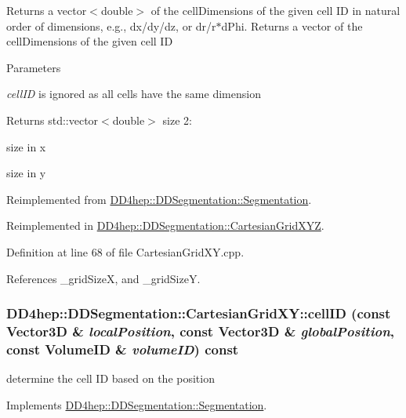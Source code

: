 Returns a vector$<$double$>$ of the cellDimensions of the given cell ID in natural order of dimensions, e.g., dx/dy/dz, or dr/r$\ast$dPhi. Returns a vector of the cellDimensions of the given cell ID 
\begin{DoxyParams}{Parameters}
\item[{\em cellID}]is ignored as all cells have the same dimension \end{DoxyParams}
\begin{DoxyReturn}{Returns}
std::vector$<$double$>$ size 2:
\begin{DoxyEnumerate}
\item size in x
\item size in y 
\end{DoxyEnumerate}
\end{DoxyReturn}


Reimplemented from \hyperlink{class_d_d4hep_1_1_d_d_segmentation_1_1_segmentation_a9710f4942d7f6b52ae5342652e17c88d}{DD4hep::DDSegmentation::Segmentation}.

Reimplemented in \hyperlink{class_d_d4hep_1_1_d_d_segmentation_1_1_cartesian_grid_x_y_z_a6a1df52f930ef7fea680bfd532d0b6cb}{DD4hep::DDSegmentation::CartesianGridXYZ}.

Definition at line 68 of file CartesianGridXY.cpp.

References \_\-gridSizeX, and \_\-gridSizeY.\hypertarget{class_d_d4hep_1_1_d_d_segmentation_1_1_cartesian_grid_x_y_ac7de84f02aa18034f60f6319982ac4e3}{
\subsubsection[{cellID}]{ DD4hep::DDSegmentation::CartesianGridXY::cellID (const {\bf Vector3D} \& {\em localPosition}, \/  const {\bf Vector3D} \& {\em globalPosition}, \/  const {\bf VolumeID} \& {\em volumeID}) const}}
\label{class_d_d4hep_1_1_d_d_segmentation_1_1_cartesian_grid_x_y_ac7de84f02aa18034f60f6319982ac4e3}


determine the cell ID based on the position 

Implements \hyperlink{class_d_d4hep_1_1_d_d_segmentation_1_1_segmentation_ad5a60953d96d409850d8192f64f8ce3c}{DD4hep::DDSegmentation::Segmentation}.

